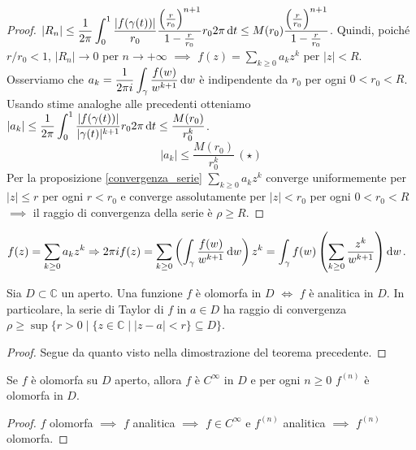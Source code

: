 \begin{proof}
  $\displaystyle |R_n| \le \frac{1}{2\pi} \int_0^1 \frac{|f(\gamma(t))|}{r_0}\frac{\left(\frac{r}{r_0}\right)^{n+1}}{1-\frac{r}{r_0}}r_02\pi\mathop{}\!\mathrm{d} t \le M(r_0) \frac{\left(\frac{r}{r_0}\right)^{n+1}}{1-\frac{r}{r_0}}$.
  Quindi, poiché $r/r_0<1$, $|R_n| \longrightarrow 0$ per $n \longrightarrow +\infty$ $\implies$ $\displaystyle f(z)=\sum_{k \ge 0}a_kz^k$ per $|z|<R$.
  Osserviamo che $\displaystyle a_k=\frac{1}{2\pi i}\int_{\gamma} \frac{f(w)}{w^{k+1}}\mathop{}\!\mathrm{d} w$ è indipendente da $r_0$ per ogni $0<r_0<R$. Usando stime analoghe alle precedenti otteniamo $\displaystyle |a_k| \le \frac{1}{2\pi} \int_0^1 \frac{|f(\gamma(t))|}{|\gamma(t)|^{k+1}}r_02\pi \mathop{}\!\mathrm{d} t \le \frac{M(r_0)}{r_0^k}$.
  $$ |a_k| \le \frac{M(r_0)}{r_0^k} \, (\star)$$
  Per la proposizione \ref{convergenza_serie} $\displaystyle \sum_{k \ge 0} a_kz^k$ converge uniformemente per $|z| \le r$ per ogni $r<r_0$ e converge assolutamente per $|z|<r_0$ per ogni $0<r_0<R$ $\implies$ il raggio di convergenza della serie è $\rho \ge R$.
\end{proof}

\begin{oss}
  $\displaystyle f(z)=\sum_{k \ge 0} a_kz^k \Rightarrow 2\pi if(z)=\sum_{k \ge 0}\left(\int_{\gamma} \frac{f(w)}{w^{k+1}}\mathop{}\!\mathrm{d} w\right)z^k=\int_{\gamma}f(w)\left(\sum_{k \ge 0}\frac{z^k}{w^{k+1}}\right)\mathop{}\!\mathrm{d} w$.
\end{oss}

\begin{cor}
  Sia $D \subset \mathbb{C}$ un aperto. Una funzione $f$ è olomorfa in $D$ $\iff$ $f$ è analitica in $D$. In particolare, la serie di Taylor di $f$ in $a \in D$ ha raggio di convergenza $\rho \ge \sup\{r>0 \mid \{z \in \mathbb{C} \mid |z-a|<r\}\subseteq D\}$.
\end{cor}

\begin{proof}
  Segue da quanto visto nella dimostrazione del teorema precedente.
\end{proof}

\begin{cor} \label{derivate_olo}
  Se $f$ è olomorfa su $D$ aperto, allora $f$ è $C^{\infty}$ in $D$ e per ogni $n \ge 0$ $f^{(n)}$ è olomorfa in $D$.
\end{cor}

\begin{proof}
  $f$ olomorfa $\implies$ $f$ analitica $\implies$ $f \in C^{\infty}$ e $f^{(n)}$ analitica $\implies$ $f^{(n)}$ olomorfa.
\end{proof}

